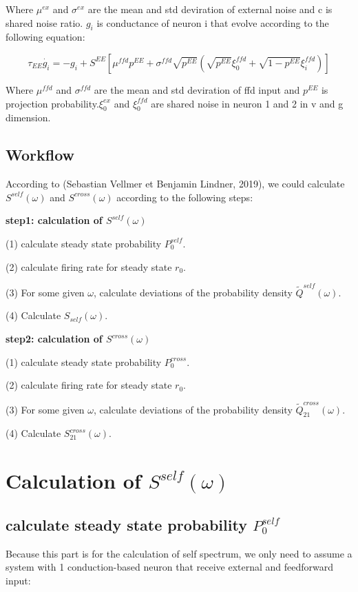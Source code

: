 \documentclass{article}
\begin{document}
	Where $\mu^{ex}$ and $\sigma^{ex}$ are the mean and std deviration of external noise and c is shared noise ratio. $g_i$ is conductance of neuron i that evolve according to the following equation: 
	
	\begin{equation}
		\tau_{EE}\dot{g_{i}}=-g_i+S^{EE}[\mu^{ffd}p^{EE}+\sigma^{ffd}\sqrt{p^{EE}}(\sqrt{p^{EE}}\xi^{ffd}_0+\sqrt{1-p^{EE}}\xi^{ffd}_i)]
	\end{equation}
	
	Where $\mu^{ffd}$ and $\sigma^{ffd}$ are the mean and std deviration of ffd input and $p^{EE}$ is projection probability.$\xi_0^{ex}$ and $\xi_0^{ffd}$ are shared noise in neuron 1 and 2 in v and g dimension.
	
	\subsection{Workflow}
	
	According to (Sebastian Vellmer et Benjamin Lindner, 2019), we could calculate $S^{self}(\omega)$ and $S^{cross}(\omega)$ according to the following steps:
	
	\textbf{step1: calculation of $S^{self}(\omega)$}
	
	(1) calculate steady state probability $P_0^{self}$.
	
	(2) calculate firing rate for steady state $r_0$.
	
	(3) For some given $\omega$, calculate deviations of the probability density $\tilde{Q}^{self}(\omega)$.
	
	(4) Calculate $S_{self}(\omega)$.
	
	\textbf{step2: calculation of $S^{cross}(\omega)$}
	
	(1) calculate steady state probability $P_0^{cross}$.
	
	(2) calculate firing rate for steady state $r_0$.
	
	(3) For some given $\omega$, calculate deviations of the probability density $\tilde{Q}^{cross}_{21}(\omega)$.
	
	(4) Calculate $S_{21}^{cross}(\omega)$.
	
	\section{Calculation of $S^{self}(\omega)$}
	\subsection{calculate steady state probability $P_0^{self}$}
	Because this part is for the calculation of self spectrum, we only need to assume a system with 1 conduction-based neuron that receive external and feedforward input:
	
\end{document}
